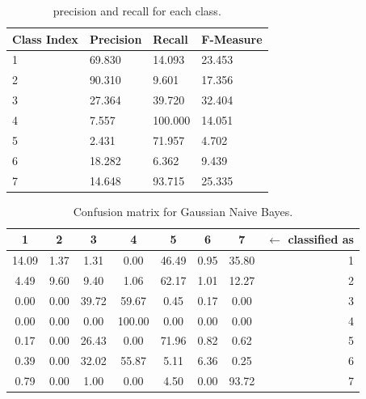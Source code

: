 \documentclass[a4paper, 10pt]{article}
\begin{document}
\begin{table}[H]
\centering
\begin{tabular}{|l|l|l|l|}
\hline
\textbf{Class Index} & \textbf{Precision} & \textbf{Recall} & \textbf{F-Measure}\\\hline
1 & 69.830 & 14.093& 23.453\\\hline
2 & 90.310 & 9.601& 17.356\\\hline
3 & 27.364 & 39.720& 32.404\\\hline
4 & 7.557 & 100.000& 14.051\\\hline
5 & 2.431 & 71.957& 4.702\\\hline
6 & 18.282 & 6.362& 9.439\\\hline
7 & 14.648 & 93.715& 25.335\\\hline
\end{tabular}
\caption{precision and recall for each class.}
\label{tab:gnb_test_pr}
\end{table}



\begin{table}[H]
\centering
\begin{tabular}{|*{7}{c|}r|}
\hline

1 &2 &3 &4 &5 &6 &7 & $\leftarrow$ classified as \\\hline

\cellcolor{black!15}14.09 &1.37 &1.31 &0.00 &46.49 &0.95 &35.80 & 1 \\\hline

4.49 &\cellcolor{black!15}9.60 &9.40 &1.06 &62.17 &1.01 &12.27 & 2 \\\hline

0.00 &0.00 &\cellcolor{black!15}39.72 &59.67 &0.45 &0.17 &0.00 & 3 \\\hline

0.00 &0.00 &0.00 &\cellcolor{black!15}100.00 &0.00 &0.00 &0.00 & 4 \\\hline

0.17 &0.00 &26.43 &0.00 &\cellcolor{black!15}71.96 &0.82 &0.62 & 5 \\\hline

0.39 &0.00 &32.02 &55.87 &5.11 &\cellcolor{black!15}6.36 &0.25 & 6 \\\hline

0.79 &0.00 &1.00 &0.00 &4.50 &0.00 &\cellcolor{black!15}93.72 & 7 \\\hline

\end{tabular}
\caption{Confusion matrix for Gaussian Naive Bayes.}
\label{tab:gnb_cf}
\end{table}
\end{document}

